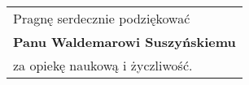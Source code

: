 \thispagestyle{empty}
\begin{titlepage}
\vspace*{18cm}
\begin{flushright}
 \begin{tabular}{l}
  Pragnę serdecznie podziękować\\
  \bfseries Panu Waldemarowi Suszyńskiemu\\
  za opiekę naukową i życzliwość.
 \end{tabular}
\end{flushright}
\end{titlepage}